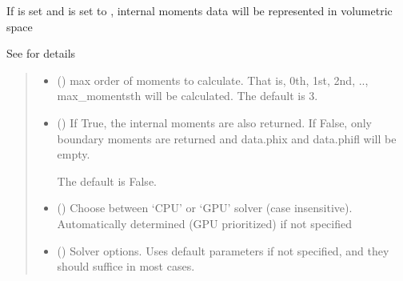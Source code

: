 \documentclass[letterpaper,10pt,english]{sphinxmanual}
\begin{document}
\begin{fulllineitems}
\begin{fulllineitems}
\sphinxAtStartPar
If  is set and  is set to , internal moments data will be represented in volumetric space

\sphinxAtStartPar
See {\hyperref[\detokenize{_autosummary/nirfasterff.forward.femdata.femdata_fl_TR_moments:nirfasterff.forward.femdata.femdata_fl_TR_moments}]{}} for details
\begin{quote}\begin{description}
\begin{itemize}
\item {} 
\sphinxAtStartPar
{} (\sphinxstyleliteralemphasis{\sphinxupquote{, }}) \textendash{} max order of moments to calculate. That is, 0th, 1st, 2nd, .., max\_moments\sphinxhyphen{}th will be calculated. The default is 3.

\item {} 
\sphinxAtStartPar
{} (\sphinxstyleliteralemphasis{\sphinxupquote{, }}) \textendash{} 
\sphinxAtStartPar
If True, the internal moments are also returned. If False, only boundary moments are returned and data.phix and data.phifl will be empty.

\sphinxAtStartPar
The default is False.


\item {} 
\sphinxAtStartPar
{} (\sphinxstyleliteralemphasis{\sphinxupquote{, }}) \textendash{} Choose between ‘CPU’ or ‘GPU’ solver (case insensitive). Automatically determined (GPU prioritized) if not specified

\item {} 
\sphinxAtStartPar
{} ({\hyperref[\detokenize{_autosummary/nirfasterff.utils.SolverOptions:nirfasterff.utils.SolverOptions}]{}}\sphinxstyleliteralemphasis{\sphinxupquote{, }}) \textendash{} 
\sphinxAtStartPar
Solver options. Uses default parameters if not specified, and they should suffice in most cases.


\end{itemize}
\end{description}
\end{quote}
\end{fulllineitems}
\end{fulllineitems}
\end{document}
